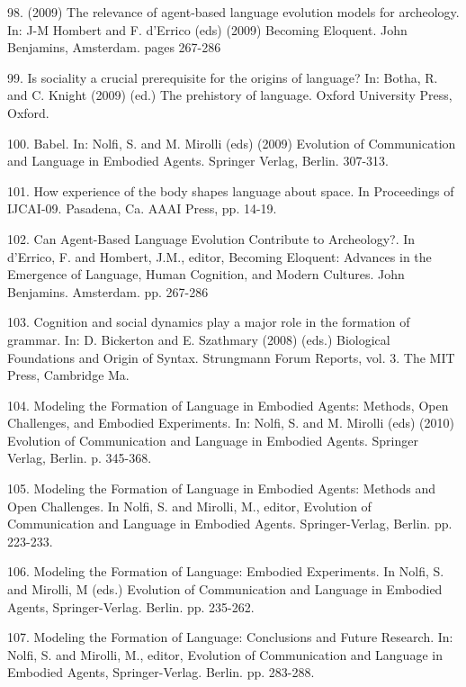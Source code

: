 98. \citet{Steels:09f} (2009) The relevance of agent-based language evolution models for archeology. In: J-M Hombert and F. d'Errico (eds) (2009) Becoming Eloquent. John Benjamins, Amsterdam. pages 267-286

99. \citet{Steels:09g} Is sociality a crucial prerequisite for the origins of language? In: Botha, R. and C. Knight (2009)
(ed.) The prehistory of language. Oxford University Press, Oxford. 

100. \citet{Steels:09h} Babel. In: Nolfi, S. and M. Mirolli (eds) (2009) Evolution of Communication and Language in Embodied Agents. Springer Verlag, Berlin. 307-313. 

101. \citet{Steels:09i} How experience of the body shapes language about space. In Proceedings of 
IJCAI-09. Pasadena, Ca. AAAI Press, pp. 14-19.  

102. \citet{Steels:09j} Can Agent-Based Language Evolution Contribute to Archeology?. In d'Errico, F. and Hombert, J.M., editor, Becoming Eloquent: Advances in the Emergence of Language, Human Cognition, and Modern Cultures. John Benjamins. Amsterdam. pp. 267-286

103. \citet{Steels:09k} Cognition and social dynamics play a major role in the formation of grammar. In: D. Bickerton and E. Szathmary (2008) (eds.) Biological Foundations and Origin of Syntax. Strungmann Forum Reports, vol. 3. The MIT Press, Cambridge Ma. 

104. \citet{Steels:10a} Modeling the Formation of Language in Embodied Agents: Methods, Open Challenges, and Embodied Experiments. In: Nolfi, S. and M. Mirolli (eds) (2010) Evolution of Communication and Language in Embodied Agents. Springer Verlag, Berlin. p. 345-368. 

105. \citet{Steels:10b} Modeling the Formation of Language in Embodied Agents: Methods and Open Challenges. In Nolfi, S. and Mirolli, M., editor, Evolution of Communication and Language in Embodied Agents. Springer-Verlag, Berlin. pp. 223-233. 

106. \citet{Steels:10c} Modeling the Formation of Language: Embodied Experiments. In Nolfi, S. and Mirolli, M (eds.) Evolution of Communication and Language in Embodied Agents, Springer-Verlag. Berlin. pp. 235-262. 

107. \citet{Steels:10d} Modeling the Formation of Language: Conclusions and Future Research. In: Nolfi, S. and Mirolli, M., editor, Evolution of Communication and Language in Embodied Agents, Springer-Verlag. Berlin. pp. 283-288. 

